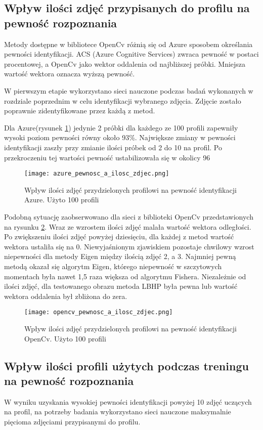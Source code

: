 \subsection{Wpływ ilości zdjęć przypisanych do profilu na pewność rozpoznania}
Metody dostępne w bibliotece OpenCv różnią się od Azure sposobem określania pewności identyfikacji. ACS (Azure Cognitive Services) zwraca pewność w postaci procentowej, a OpenCv jako wektor oddalenia od najbliższej próbki. Mniejsza wartość wektora oznacza wyższą pewność.

W pierwszym etapie wykorzystano sieci nauczone podczas badań wykonanych w rozdziale poprzednim w celu identyfikacji wybranego zdjęcia. Zdjęcie zostało poprawnie zidentyfikowane przez każdą z metod.

Dla Azure(rysunek \ref{fig:azure_zdjecia}) jedynie 2 próbki dla każdego ze 100 profili zapewniły wysoki poziom pewności równy około 93\%. Największe zmiany w pewności identyfikacji zaszły przy zmianie ilości próbek od 2 do 10 na profil. Po przekroczeniu tej wartości pewność ustabilizowała się w okolicy 96%
\begin{figure}[H]
	\centering
	\texttt{[image: azure\_pewnosc\_a\_ilosc\_zdjec.png]}
	\caption{Wpływ ilości zdjęć przydzielonych profilowi na pewność identyfikacji Azure. Użyto 100 profili}
	\label{fig:azure_zdjecia}
\end{figure}
Podobną sytuację zaobserwowano dla sieci z biblioteki OpenCv przedstawionych na rysunku \ref{fig:opencv_zdjecia}. Wraz ze wzrostem ilości zdjęć malała wartość wektora odległości. Po zwiększeniu ilości zdjęć powyżej dziesięciu, dla każdej z metod wartość wektora ustaliła się na 0. Niewyjaśnionym zjawiskiem pozostaje chwilowy wzrost niepewności dla metody Eigen między ilością zdjęć 2, a 3. Najmniej pewną metodą okazał się algorytm Eigen, którego niepewność w szczytowych momentach była nawet 1,5 raza większa od algorytmu Fishera. Niezależnie od ilości zdjęć, dla testowanego obrazu metoda LBHP była pewna lub wartość wektora oddalenia był zbliżona do zera.
\begin{figure}[H]
	\centering
	\texttt{[image: opencv\_pewnosc\_a\_ilosc\_zdjec.png]}
	\caption{Wpływ ilości zdjęć przydzielonych profilowi na pewność identyfikacji OpenCv. Użyto 100 profili}
	\label{fig:opencv_zdjecia}
\end{figure}

\subsection{Wpływ ilości profili użytych podczas treningu na pewność rozpoznania}
W wyniku uzyskania wysokiej pewności identyfikacji powyżej 10 zdjęć uczących na profil, na potrzeby badania wykorzystano sieci nauczone maksymalnie pięcioma zdjęciami przypisanymi do profilu.

